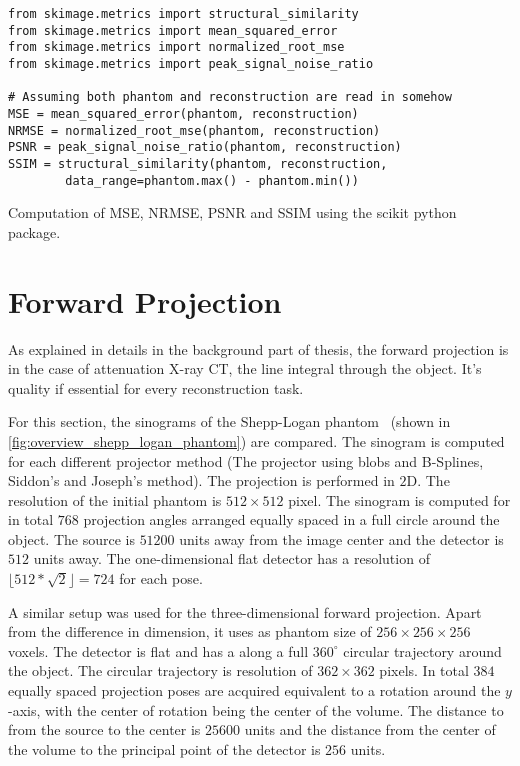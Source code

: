 \begin{listing}[h]
	\begin{verbatim}
from skimage.metrics import structural_similarity
from skimage.metrics import mean_squared_error
from skimage.metrics import normalized_root_mse
from skimage.metrics import peak_signal_noise_ratio

# Assuming both phantom and reconstruction are read in somehow
MSE = mean_squared_error(phantom, reconstruction)
NRMSE = normalized_root_mse(phantom, reconstruction)
PSNR = peak_signal_noise_ratio(phantom, reconstruction)
SSIM = structural_similarity(phantom, reconstruction,
        data_range=phantom.max() - phantom.min())
    \end{verbatim}
	\caption{Computation of \gls{MSE}, \gls{NRMSE}, \gls{PSNR} and \gls{SSIM} using the scikit python package.}\label{py:error_metric}
\end{listing}

\section{Forward Projection}\label{sec:experiments_forward_projection}

As explained in details in the background part of thesis, the forward projection is in the case of
attenuation X-ray CT, the line integral through the object. It's quality if essential for every
reconstruction task.

For this section, the sinograms of the Shepp-Logan phantom~\cite{shepp_fourier_1974} (shown in
\autoref{fig:overview_shepp_logan_phantom}) are compared. The sinogram is computed for each
different projector method (The projector using blobs and B-Splines, Siddon's and Joseph's method).
The projection is performed in \(2\)D. The resolution of the initial phantom is \(512 \times 512\)
pixel. The sinogram is computed for in total \(768\) projection angles arranged equally spaced in a
full circle around the object. The source is \(51200\) units away from the image center and the
detector is \(512\) units away. The one-dimensional flat detector has a resolution of \(\lfloor 512
* \sqrt{2} \rfloor = 724\) for each pose.

A similar setup was used for the three-dimensional forward projection. Apart from the difference in
dimension, it uses as phantom size of \(256 \times 256 \times 256\) voxels. The detector is flat and
has a along a full \(360^\circ\) circular trajectory around the object. The circular trajectory is
resolution of \(362 \times 362\) pixels. In total \(384\) equally spaced projection poses are
acquired equivalent to a rotation around the \(y\)-axis, with the center of rotation being the
center of the volume. The distance to from the source to the center is \(25600\) units and the
distance from the center of the volume to the principal point of the detector is \(256\) units.


